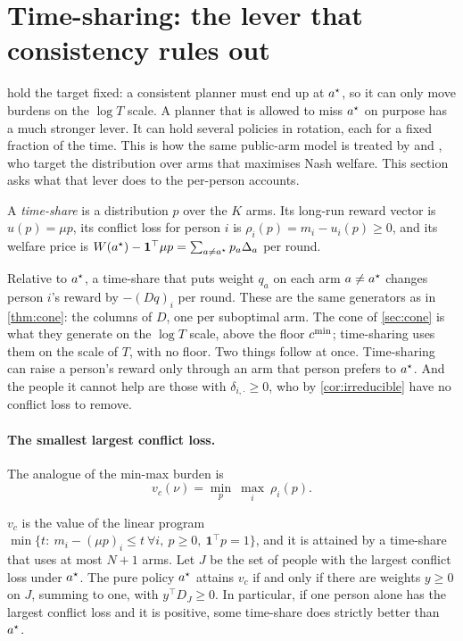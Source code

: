\section{Time-sharing: the lever that consistency rules out}\label{sec:sharing}

 hold the target fixed: a consistent planner must end up at $a^\star$, so it can only move burdens on the $\log T$ scale. A planner that is allowed to miss $a^\star$ on purpose has a much stronger lever. It can hold several policies in rotation, each for a fixed fraction of the time. This is how the same public-arm model is treated by \citet{hossain2021} and \citet{jones2023}, who target the distribution over arms that maximises Nash welfare. This section asks what that lever does to the per-person accounts.

\begin{definition}
A \emph{time-share} is a distribution $p$ over the $K$ arms. Its long-run reward vector is $u(p)=\mu p$, its conflict loss for person $i$ is $\rho_i(p)=m_i-u_i(p)\ge0$, and its welfare price is $W(a^\star)-\mathbf 1^\top\mu p=\sum_{a\neq a^\star}p_a\Delta_a$ per round.
\end{definition}

Relative to $a^\star$, a time-share that puts weight $q_a$ on each arm $a\neq a^\star$ changes person $i$'s reward by $-(Dq)_i$ per round. These are the same generators as in \cref{thm:cone}: the columns of $D$, one per suboptimal arm. The cone of \cref{sec:cone} is what they generate on the $\log T$ scale, above the floor $c^{\min}$; time-sharing uses them on the scale of $T$, with no floor. Two things follow at once. Time-sharing can raise a person's reward only through an arm that person prefers to $a^\star$. And the people it cannot help are those with $\delta_{i,\cdot}\ge0$, who by \cref{cor:irreducible} have no conflict loss to remove.

\paragraph{The smallest largest conflict loss.} The analogue of the min-max burden is
\[
  v_c(\nu)=\min_{p}\ \max_i\ \rho_i(p).
\]

\begin{proposition}\label{prop:share}
$v_c$ is the value of the linear program $\min\{t:\ m_i-(\mu p)_i\le t\ \forall i,\ p\ge0,\ \mathbf 1^\top p=1\}$, and it is attained by a time-share that uses at most $N+1$ arms. Let $J$ be the set of people with the largest conflict loss under $a^\star$. The pure policy $a^\star$ attains $v_c$ if and only if there are weights $y\ge0$ on $J$, summing to one, with $y^\top D_J\ge0$. In particular, if one person alone has the largest conflict loss and it is positive, some time-share does strictly better than $a^\star$.
\end{proposition}

